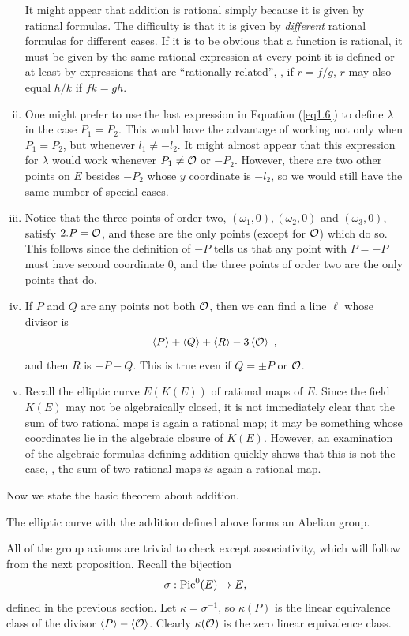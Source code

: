 \begin{enumerate}[(i)]
It might appear that addition is rational simply because it is given by rational formulas. The difficulty is that it is given by {\it different} rational formulas for different cases. If it is to be obvious that a function is rational, it must be given by the same rational expression at every point it is defined or at least by expressions that are ``rationally related'', \ie, if $r=f/g$, $r$ may also equal $h/k$ if $fk=gh$.
\item
One might prefer to use the last expression in Equation (\ref{eq1.6}) to define $\lambda$ in the case $P_{1}=P_{2}$. This would have the advantage of working not only when $P_{1}=P_{2}$, but whenever $l_{1}\neq-l_{2}$. It might almost appear that this expression for $\lambda$ would work whenever $P_{1}\neq \mathcal{O}$ or $-P_{2}$. However, there are two other points on $E$ besides $-P_{2}$ whose $y$ coordinate is $-l_{2}$, so we would still have the same number of special cases.
\item
Notice that the three points of order two, $(\omega_{1},0),(\omega_{2},0)$ and $(\omega_{3},0)$, satisfy $2. P=\mathcal{O}$, and these are the only points (except for $\mathcal{O}$) which do so. This follows since the definition of $-P$ tells us that any point with $P=-P$ must have second coordinate $0$, and the three points of order two are the only points that do.
\item
If $P$ and $Q$ are any points not both $\mathcal{O}$, then we can find a line $\ell$ whose divisor is
$$
\divisor{P}+\divisor{Q}+\divisor{R}-3\divisor{\cuz}\ ,
$$
and then $R$ is $-P-Q$. This is true even if $Q=\pm P$ or $\mathcal{O}$.
\item
Recall the elliptic curve $E(K(E))$ of rational maps of $E$. Since the field $K(E)$ may not be algebraically closed, it is not immediately clear that the sum of two rational maps is again a rational map; it may be something whose coordinates lie in the algebraic closure of $K(E)$. However, an examination of the algebraic formulas defining addition quickly shows that this is not the case, \ie, the sum of two rational maps $is$ again a rational map.
\end{enumerate}

Now we state the basic theorem about addition.

\begin{theo}
\label{t6.2}
The elliptic curve with the addition defined above forms an Abelian group.
\end{theo}

All of the group axioms are trivial to check except associativity, which will follow from the next proposition. Recall the bijection
$$
\sigma:\operatorname{Pic}^{0}(E)\rightarrow E,
$$
defined in the previous section. Let $\kappa =\sigma^{-1}$, so $\kappa(P)$ is the linear equivalence class of the divisor  
$\left\langle P \right \rangle-\left\langle \mathcal{O} \right \rangle$. Clearly $\kappa(\mathcal{O})$ is the zero linear equivalence class.

